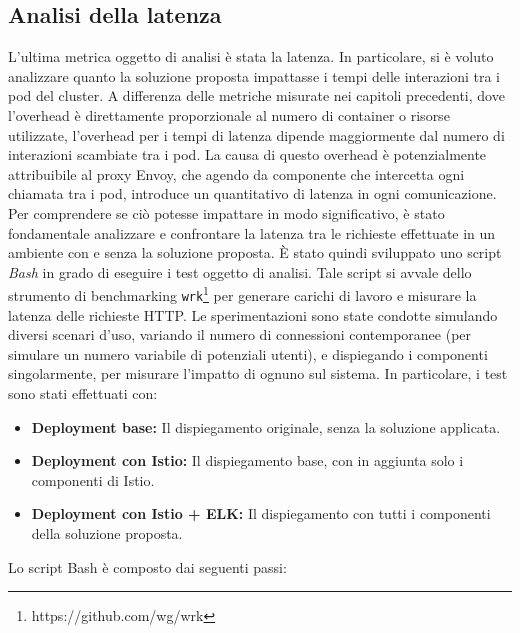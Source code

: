 \subsection{Analisi della latenza}
L'ultima metrica oggetto di analisi è stata la latenza. In particolare, si è voluto analizzare quanto la soluzione proposta impattasse i tempi delle interazioni tra i pod del cluster. A differenza delle metriche misurate nei capitoli precedenti, dove l'overhead è direttamente proporzionale al numero di container o risorse utilizzate, l'overhead per i tempi di latenza dipende maggiormente dal numero di interazioni scambiate tra i pod. La causa di questo overhead è potenzialmente attribuibile al proxy Envoy, che agendo da componente che intercetta ogni chiamata tra i pod, introduce un quantitativo di latenza in ogni comunicazione. Per comprendere se ciò potesse impattare in modo significativo, è stato fondamentale analizzare e confrontare la latenza tra le richieste effettuate in un ambiente con e senza la soluzione proposta. È stato quindi sviluppato uno script \textit{Bash} in grado di eseguire i test oggetto di analisi. Tale script si avvale dello strumento di benchmarking \texttt{wrk}\footnote{https://github.com/wg/wrk} per generare carichi di lavoro e misurare la latenza delle richieste HTTP. Le sperimentazioni sono state condotte simulando diversi scenari d'uso, variando il numero di connessioni contemporanee (per simulare un numero variabile di potenziali utenti), e dispiegando i componenti singolarmente, per misurare l'impatto di ognuno sul sistema. 
In particolare, i test sono stati effettuati con:
\begin{itemize}
    \item \textbf{Deployment base:} Il dispiegamento originale, senza la soluzione applicata.
    \item \textbf{Deployment con Istio:} Il dispiegamento base, con in aggiunta solo i componenti di Istio.
    \item \textbf{Deployment con Istio + ELK:} Il dispiegamento con tutti i componenti della soluzione proposta.
\end{itemize}
Lo script Bash è composto dai seguenti passi:

